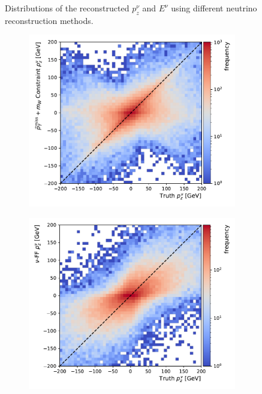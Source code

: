 \begin{figure}[ht]
\begin{subfigure}{0.40\textwidth}
        \caption{} \label{fig:nu_E}
    \end{subfigure}
    \caption{Distributions of the reconstructed $p_z^\nu$  and $E^\nu$  using different neutrino reconstruction methods.}
    \label{fig:marginal_dists}
\end{figure}


\begin{figure}[ht]
    \centering
    \begin{subfigure}{0.40\textwidth}
        \includegraphics[width=\textwidth]{Figures/neutrino_unfolding/p_z_quad.pdf}
        \caption{} \label{fig:px_dist}
    \end{subfigure}
    \begin{subfigure}{0.40\textwidth}
        \includegraphics[width=\textwidth]{Figures/neutrino_unfolding/p_z_ff.pdf}

\end{subfigure}
\end{figure}
